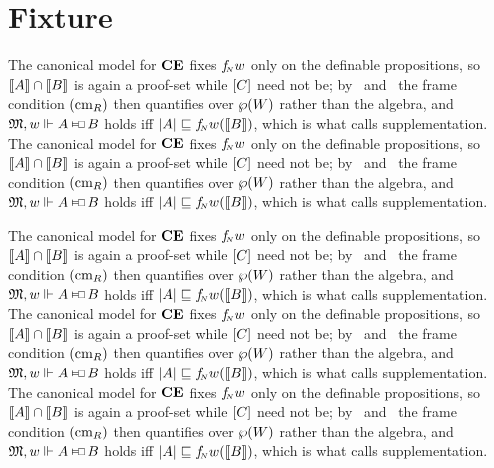 \documentclass[letterpaper,12pt]{article}
\begin{document}
\section{Fixture}

The canonical model for $\textup{\textbf{CE}}$ fixes ${f_{{\mkern-3.6mu\scriptscriptstyle N}}}{w}$ only on the definable propositions, so $\llbracket A\rrbracket\cap\llbracket B\rrbracket$ is again a proof-set while $[C]$ need not be; by \CMl\ and \CMr\ the frame condition $(\textnormal{cm}_{R})$ then quantifies over $\wp(W)$ rather than the algebra, and $\M,w\trues A\cnecs B$ holds iff $|A|\sqsubseteq{f_{{\mkern-3.6mu\scriptscriptstyle N}}}{w}(\llbracket B\rrbracket)$, which is what \cite{chellas1980} calls supplementation. The canonical model for $\textup{\textbf{CE}}$ fixes ${f_{{\mkern-3.6mu\scriptscriptstyle N}}}{w}$ only on the definable propositions, so $\llbracket A\rrbracket\cap\llbracket B\rrbracket$ is again a proof-set while $[C]$ need not be; by \CMl\ and \CMr\ the frame condition $(\textnormal{cm}_{R})$ then quantifies over $\wp(W)$ rather than the algebra, and $\M,w\trues A\cnecs B$ holds iff $|A|\sqsubseteq{f_{{\mkern-3.6mu\scriptscriptstyle N}}}{w}(\llbracket B\rrbracket)$, which is what \cite{chellas1980} calls supplementation.

The canonical model for $\textup{\textbf{CE}}$ fixes ${f_{{\mkern-3.6mu\scriptscriptstyle N}}}{w}$ only on the definable propositions, so $\llbracket A\rrbracket\cap\llbracket B\rrbracket$ is again a proof-set while $[C]$ need not be; by \CMl\ and \CMr\ the frame condition $(\textnormal{cm}_{R})$ then quantifies over $\wp(W)$ rather than the algebra, and $\M,w\trues A\cnecs B$ holds iff $|A|\sqsubseteq{f_{{\mkern-3.6mu\scriptscriptstyle N}}}{w}(\llbracket B\rrbracket)$, which is what \cite{chellas1980} calls supplementation. The canonical model for $\textup{\textbf{CE}}$ fixes ${f_{{\mkern-3.6mu\scriptscriptstyle N}}}{w}$ only on the definable propositions, so $\llbracket A\rrbracket\cap\llbracket B\rrbracket$ is again a proof-set while $[C]$ need not be; by \CMl\ and \CMr\ the frame condition $(\textnormal{cm}_{R})$ then quantifies over $\wp(W)$ rather than the algebra, and $\M,w\trues A\cnecs B$ holds iff $|A|\sqsubseteq{f_{{\mkern-3.6mu\scriptscriptstyle N}}}{w}(\llbracket B\rrbracket)$, which is what \cite{chellas1980} calls supplementation. The canonical model for $\textup{\textbf{CE}}$ fixes ${f_{{\mkern-3.6mu\scriptscriptstyle N}}}{w}$ only on the definable propositions, so $\llbracket A\rrbracket\cap\llbracket B\rrbracket$ is again a proof-set while $[C]$ need not be; by \CMl\ and \CMr\ the frame condition $(\textnormal{cm}_{R})$ then quantifies over $\wp(W)$ rather than the algebra, and $\M,w\trues A\cnecs B$ holds iff $|A|\sqsubseteq{f_{{\mkern-3.6mu\scriptscriptstyle N}}}{w}(\llbracket B\rrbracket)$, which is what \cite{chellas1980} calls supplementation.
\end{document}
